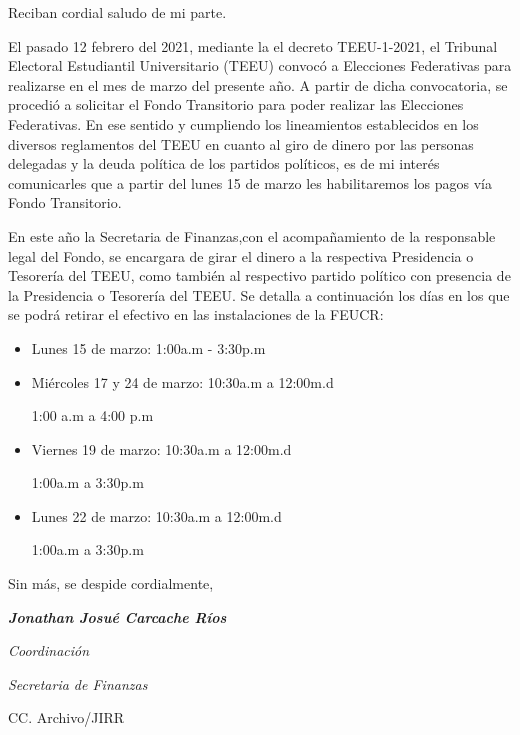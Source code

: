 \documentclass[12pt]{article}
\begin{document}
Reciban cordial saludo de mi parte.\par
El pasado 12 febrero del 2021,  mediante la el decreto TEEU-1-2021, el Tribunal Electoral Estudiantil Universitario (TEEU) convocó a Elecciones Federativas para realizarse en el mes de marzo del presente año. A partir de dicha convocatoria, se procedió a solicitar el Fondo Transitorio para poder realizar las Elecciones Federativas. En ese sentido y cumpliendo los lineamientos establecidos en los diversos reglamentos del TEEU en cuanto al giro de dinero por las personas delegadas y la deuda política de los partidos políticos, es de mi interés comunicarles que a partir del lunes 15 de marzo les habilitaremos los pagos vía Fondo Transitorio.\par
En este año la Secretaria de Finanzas,con el acompañamiento de la responsable legal del Fondo, se encargara de girar el dinero a la respectiva Presidencia o Tesorería del TEEU, como también al respectivo partido político con presencia de la Presidencia o Tesorería del TEEU. Se detalla a continuación los días en los que se podrá retirar el efectivo en las instalaciones de la FEUCR:\par
\begin{itemize}
    \item Lunes 15 de marzo: 1:00a.m - 3:30p.m
    \item Miércoles 17 y 24 de marzo: 10:30a.m a 12:00m.d\par
    1:00 a.m a 4:00 p.m
    \item Viernes 19 de marzo: 10:30a.m a 12:00m.d\par
    1:00a.m a 3:30p.m
    \item Lunes 22 de marzo: 10:30a.m a 12:00m.d\par
    1:00a.m a 3:30p.m
\end{itemize}
Sin más, se despide cordialmente,\par
\bigskip
\bigskip
\bigskip
\begin{spacing}{1}
\textit{         }\par
\textit{\textbf{Jonathan Josué Carcache Ríos}}\par
\textit{Coordinación}\par
\textit{Secretaria de Finanzas}
\end{spacing}
\medskip
\begin{flushleft}\begin{spacing}{1}
 \scriptsize{CC. Archivo/JIRR

 }
\end{spacing}\end{flushleft}
%
%
\end{document}
